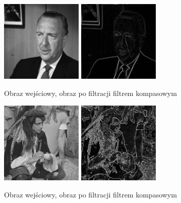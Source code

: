 \documentclass[final,a4paper,openany,12pt]{mwbk}
\begin{document}
\begin{figure}[H]
	\begin{center}
		\includegraphics[width=0.35\textwidth]{gentelman_gray}
		\includegraphics[width=0.35\textwidth]{gentelman_gray_compassSobol_result}
	\end{center}
	\caption{Obraz wejściowy, obraz po filtracji filtrem kompasowym}
\end{figure}

\begin{figure}[H]
	\begin{center}
		\includegraphics[width=0.35\textwidth]{pirate_gray}
		\includegraphics[width=0.35\textwidth]{pirate_gray_compassSobol_result}
	\end{center}
	\caption{Obraz wejściowy, obraz po filtracji filtrem kompasowym}
\end{figure}
\end{document}
